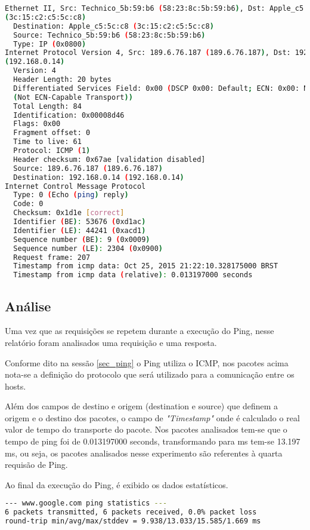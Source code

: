 \documentclass[a4paper]{report} %
\begin{document}
\begin{lstlisting}[language=bash]
Ethernet II, Src: Technico_5b:59:b6 (58:23:8c:5b:59:b6), Dst: Apple_c5:5c:c8
(3c:15:c2:c5:5c:c8)
  Destination: Apple_c5:5c:c8 (3c:15:c2:c5:5c:c8)
  Source: Technico_5b:59:b6 (58:23:8c:5b:59:b6)
  Type: IP (0x0800)
Internet Protocol Version 4, Src: 189.6.76.187 (189.6.76.187), Dst: 192.168.0.14
(192.168.0.14)
  Version: 4
  Header Length: 20 bytes
  Differentiated Services Field: 0x00 (DSCP 0x00: Default; ECN: 0x00: Not-ECT
  (Not ECN-Capable Transport))
  Total Length: 84
  Identification: 0x00008d46
  Flags: 0x00
  Fragment offset: 0
  Time to live: 61
  Protocol: ICMP (1)
  Header checksum: 0x67ae [validation disabled]
  Source: 189.6.76.187 (189.6.76.187)
  Destination: 192.168.0.14 (192.168.0.14)
Internet Control Message Protocol
  Type: 0 (Echo (ping) reply)
  Code: 0
  Checksum: 0x1d1e [correct]
  Identifier (BE): 53676 (0xd1ac)
  Identifier (LE): 44241 (0xacd1)
  Sequence number (BE): 9 (0x0009)
  Sequence number (LE): 2304 (0x0900)
  Request frame: 207
  Timestamp from icmp data: Oct 25, 2015 21:22:10.328175000 BRST
  Timestamp from icmp data (relative): 0.013197000 seconds
\end{lstlisting}

\subsection{Análise}
\label{sub_ping_analise}
Uma vez que as requisições se repetem durante a execução do Ping, nesse relatório foram analisados uma requisição e uma resposta.

Conforme dito na sessão \ref{sec_ping} o Ping utiliza o ICMP, nos pacotes acima nota-se a definição do protocolo que será utilizado para a comunicação entre os hosts.

Além dos campos de destino e origem (destination e source) que definem a origem e o destino dos pacotes, o campo de \textit{"Timestamp"} onde é calculado o real valor de tempo do transporte do pacote. Nos pacotes analisados tem-se que o tempo de ping foi de 0.013197000 seconds, transformando para ms tem-se 13.197 ms, ou seja, os pacotes analisados nesse experimento são referentes à quarta requisão de Ping.

Ao final da execução do Ping, é exibido os dados estatísticos.

\begin{lstlisting}[language=bash]
--- www.google.com ping statistics ---
6 packets transmitted, 6 packets received, 0.0% packet loss
round-trip min/avg/max/stddev = 9.938/13.033/15.585/1.669 ms
\end{lstlisting}
\end{document}
